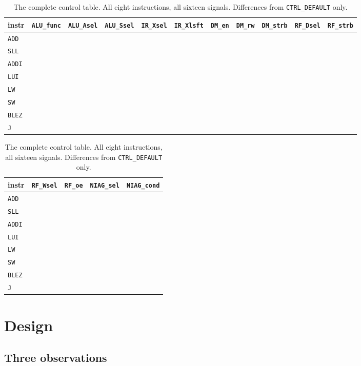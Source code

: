 \begin{table}[htbp]
\centering
\caption{The complete control table. All eight instructions, all sixteen signals.
Differences from \texttt{CTRL\_DEFAULT} only.}
\label{tab:lab11-ctrl}
\scriptsize
\begin{tabular}{lllllllllll}
\toprule
instr & \texttt{ALU\_func} & \texttt{ALU\_Asel} & \texttt{ALU\_Ssel} & \texttt{IR\_Xsel} & \texttt{IR\_Xlsft} & \texttt{DM\_en} & \texttt{DM\_rw} & \texttt{DM\_strb} & \texttt{RF\_Dsel} & \texttt{RF\_strb} \\
\midrule
\texttt{ADD}  & & & & & & & & & & \\
\texttt{SLL}  & & & & & & & & & & \\
\texttt{ADDI} & & & & & & & & & & \\
\texttt{LUI}  & & & & & & & & & & \\
\texttt{LW}   & & & & & & & & & & \\
\texttt{SW}   & & & & & & & & & & \\
\texttt{BLEZ} & & & & & & & & & & \\
\texttt{J}    & & & & & & & & & & \\
\bottomrule
\end{tabular}

\vspace{6pt}

\begin{tabular}{lllll}
\toprule
instr & \texttt{RF\_Wsel} & \texttt{RF\_oe} & \texttt{NIAG\_sel} & \texttt{NIAG\_cond} \\
\midrule
\texttt{ADD}  & & & & \\
\texttt{SLL}  & & & & \\
\texttt{ADDI} & & & & \\
\texttt{LUI}  & & & & \\
\texttt{LW}   & & & & \\
\texttt{SW}   & & & & \\
\texttt{BLEZ} & & & & \\
\texttt{J}    & & & & \\
\bottomrule
\end{tabular}
\end{table}

\section{Design}

\subsection*{Three observations}
%
%
%

